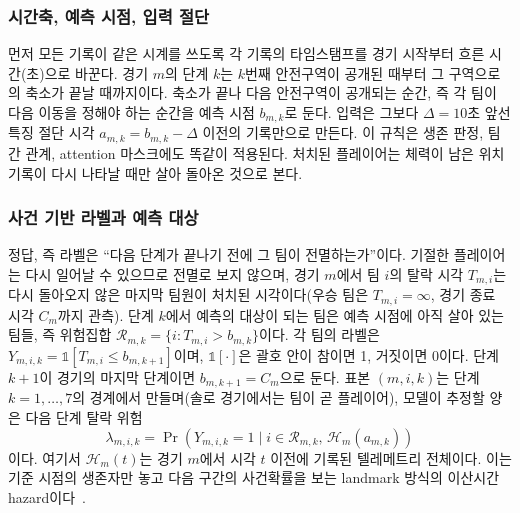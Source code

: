 \subsubsection{시간축, 예측 시점, 입력 절단}
먼저 모든 기록이 같은 시계를 쓰도록 각 기록의 타임스탬프를 경기 시작부터 흐른 시간(초)으로 바꾼다.
경기 $m$의 단계 $k$는 $k$번째 안전구역이 공개된 때부터 그 구역으로의 축소가 끝날 때까지이다.
축소가 끝나 다음 안전구역이 공개되는 순간, 즉 각 팀이 다음 이동을 정해야 하는 순간을 예측 시점 $b_{m,k}$로 둔다.
입력은 그보다 $\Delta=10$초 앞선 특징 절단 시각 $a_{m,k}=b_{m,k}-\Delta$ 이전의 기록만으로 만든다. 
이 규칙은 생존 판정, 팀 간 관계, attention 마스크에도 똑같이 적용된다.
처치된 플레이어는  체력이 남은 위치 기록이 다시 나타날 때만 살아 돌아온 것으로 본다.

\subsubsection{사건 기반 라벨과 예측 대상}
정답, 즉 라벨은 “다음 단계가 끝나기 전에 그 팀이 전멸하는가”이다.
기절한 플레이어는 다시 일어날 수 있으므로 전멸로 보지 않으며, 경기 $m$에서 팀 $i$의 탈락 시각 $T_{m,i}$는 다시 돌아오지 않은 마지막 팀원이 처치된 시각이다(우승 팀은 $T_{m,i}=\infty$, 경기 종료 시각 $C_m$까지 관측).
단계 $k$에서 예측의 대상이 되는 팀은 예측 시점에 아직 살아 있는 팀들, 즉 위험집합 $\mathcal{R}_{m,k}=\{i: T_{m,i}>b_{m,k}\}$이다. 
각 팀의 라벨은 $Y_{m,i,k}=\mathbb{1}[T_{m,i}\le b_{m,k+1}]$이며, $\mathbb{1}[\cdot]$은 괄호 안이 참이면 1, 거짓이면 0이다. 단계 $k+1$이 경기의 마지막 단계이면 $b_{m,k+1}=C_m$으로 둔다.
표본 $(m,i,k)$는 단계 $k=1,\dots,7$의 경계에서 만들며(솔로 경기에서는 팀이 곧 플레이어), 모델이 추정할 양은 다음 단계 탈락 위험
\begin{equation}
\lambda_{m,i,k}=\Pr\!\left(Y_{m,i,k}=1 \mid i\in\mathcal{R}_{m,k},\,\mathcal{H}_{m}(a_{m,k})\right)
\label{eq:hazard}
\end{equation}
이다. 여기서 $\mathcal{H}_{m}(t)$는 경기 $m$에서 시각 $t$ 이전에 기록된 텔레메트리 전체이다.
이는 기준 시점의 생존자만 놓고 다음 구간의 사건확률을 보는 landmark 방식의 이산시간 hazard이다~\cite{SingerWillett93,vanHouwelingen07}.

